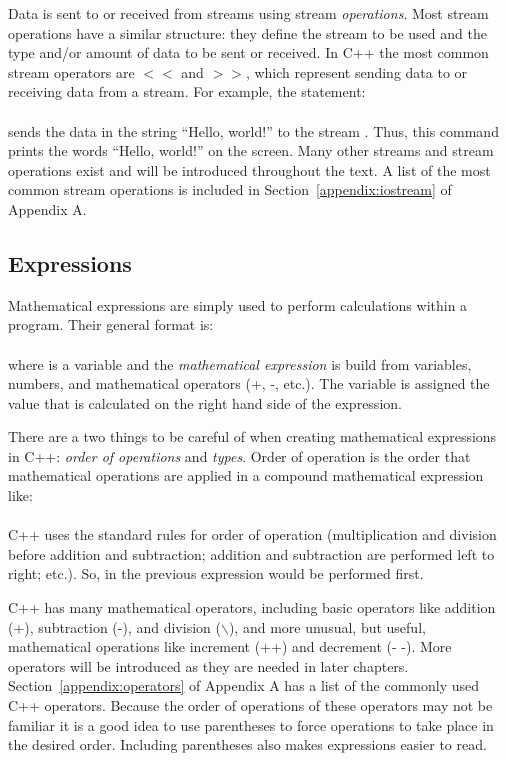Data is sent to or received from streams using stream \emph{operations}.  Most stream operations have a similar structure: they define the stream to be used and the type and/or amount of data to be sent or received.  In C++ the most common stream operators are $<<$ and $>>$, which represent sending data to or receiving data from a stream.  For example, the statement:\\
\\
sends the data in the string ``Hello, world!'' to the stream . Thus, this command prints the words ``Hello, world!'' on the screen.  Many other streams and stream operations exist and will be introduced throughout the text.  A list of the most common stream operations is included in Section~\ref{appendix:iostream} of Appendix A. 

\subsection{Expressions}

Mathematical expressions are simply used to perform calculations within a program.  Their general format is:\\
\\
where  is a variable and the \emph{mathematical expression} is build from variables, numbers, and mathematical operators (+, -, etc.).  The variable  is assigned the value that is calculated on the right hand side of the expression.  

There are a two things to be careful of when creating mathematical expressions in C++: \emph{order of operations} and \emph{types}.  Order of operation is the order that mathematical operations are applied in a compound mathematical expression like:\\
\\
C++ uses the standard rules for order of operation (multiplication and division before addition and subtraction; addition and subtraction are performed left to right; etc.).  So, in the previous expression  would be performed first.  %

C++ has many mathematical operators, including basic operators like addition (+), subtraction (-), and division ($\backslash$), and more unusual, but useful, mathematical operations like increment (++) and decrement (- -).  More operators will be introduced as they are needed in later chapters.  Section~\ref{appendix:operators} of Appendix A has a list of the commonly used C++ operators.  Because the order of operations of these operators may not be familiar it is a good idea to use parentheses to force operations to take place in the desired order.  Including parentheses also makes expressions easier to read.

